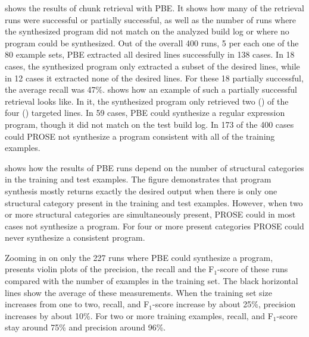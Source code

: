  shows the results of chunk
retrieval with PBE.
It shows how many of the retrieval runs were successful or
partially successful, as well as the number of runs where the
synthesized program did not match on the analyzed build log or where
no program could be synthesized.
Out of the overall 400 runs, 5 per each one of the 80 example
sets, PBE extracted all desired lines successfully in 138 cases.
In 18 cases, the synthesized program only extracted a
subset of the desired lines, while in 12 cases it extracted none of
the desired lines.
For these 18 partially successful, the average recall
was 47\%.
 shows how an example of such
a partially successful retrieval looks like.
In it, the synthesized program only
retrieved two ()
of the four () targeted lines.
In 59 cases, PBE could synthesize a regular expression program, though
it did not match on the test build log.
In 173 of the 400 cases
could PROSE not synthesize a program consistent with all of the training
examples.

 shows how
the results of PBE
runs depend on the number of structural categories in the training and
test examples.
The figure demonstrates that program synthesis mostly
returns exactly the desired output when there is only one
structural category present in the training and test examples.
However, when
two or more structural categories are simultaneously present,
PROSE could in most cases not synthesize a program.
For four or more present
categories PROSE could never synthesize a consistent program.

Zooming in on only the 227 runs where PBE could synthesize a program,
presents violin plots of the precision, the recall
and the F$_{1}$-score
of these runs compared with the number of examples in the training set.
The black horizontal lines show the average of these measurements.
When the training set
size increases from one to two, recall, and F$_{1}$-score increase by
about 25\%, precision increases by about 10\%.
For two or more
training examples, recall, and F$_{1}$-score stay around 75\% and
precision around 96\%.

